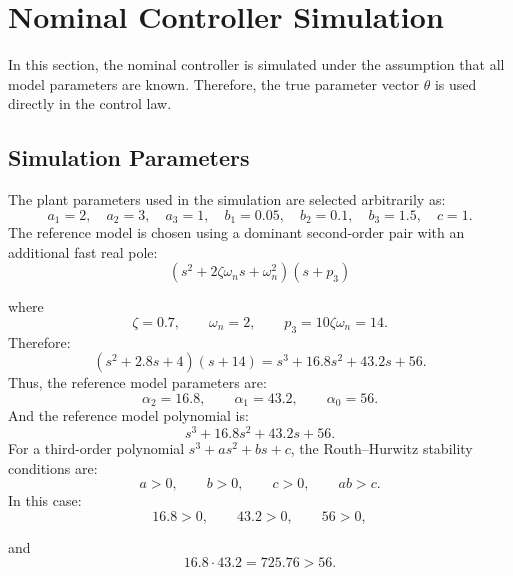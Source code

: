\section{Nominal Controller Simulation}

In this section, the nominal controller is simulated under the assumption that all model parameters are known. Therefore, the true parameter vector \(\theta\) is used directly in the control law.

\subsection{Simulation Parameters}

The plant parameters used in the simulation are selected arbitrarily as:
\begin{equation}
a_1=2,\quad
a_2=3,\quad
a_3=1,\quad
b_1=0.05,\quad
b_2=0.1,\quad
b_3=1.5,\quad
c=1.
\end{equation}
The reference model is chosen using a dominant second-order pair with an additional fast real pole:
\begin{equation}
\left(s^2+2\zeta\omega_n s+\omega_n^2\right)(s+p_3)
\end{equation}

where
\begin{equation}
\zeta=0.7,\qquad
\omega_n=2,\qquad
p_3=10\zeta\omega_n=14.
\end{equation}
Therefore:
\begin{equation}
\left(s^2+2.8s+4\right)(s+14)
=
s^3+16.8s^2+43.2s+56.
\end{equation}
Thus, the reference model parameters are:
\begin{equation}
\alpha_2=16.8,\qquad
\alpha_1=43.2,\qquad
\alpha_0=56.
\end{equation}
And the reference model polynomial is:
\begin{equation}
s^3+16.8s^2+43.2s+56.
\end{equation}
For a third-order polynomial
$s^3+a s^2+b s+c$,
the Routh--Hurwitz stability conditions are:
\begin{equation}
a>0,\qquad b>0,\qquad c>0,\qquad ab>c.
\end{equation}
In this case:
\begin{equation}
16.8>0,\qquad
43.2>0,\qquad
56>0,
\end{equation}

and
\begin{equation}
16.8\cdot43.2
=
725.76
>
56.
\end{equation}

